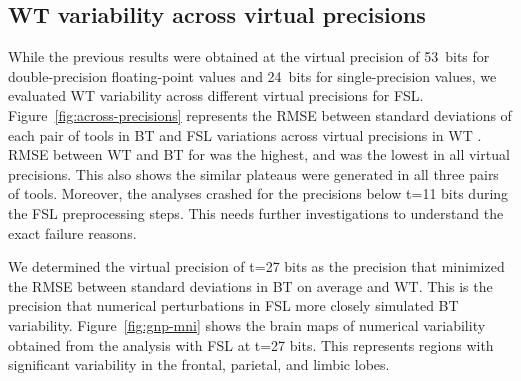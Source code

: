 \documentclass[conference]{IEEEtran}
\begin{document}
\subsection{WT variability across virtual precisions}

While the previous results were obtained at the virtual precision of 53~bits for double-precision floating-point values
and 24~bits for single-precision values, we evaluated WT variability across different virtual precisions for FSL. 
Figure~\ref{fig:across-precisions} represents the RMSE between standard deviations of each pair of tools in BT and FSL variations across virtual precisions in WT .
RMSE between WT and BT for \fslafni was the highest, and \fslspm was the lowest in all virtual precisions.
This also shows the similar plateaus were generated in all three pairs of tools.
Moreover, the analyses crashed for the precisions below t=11 bits during the FSL preprocessing steps. 
This needs further investigations to understand the exact failure reasons. 

We determined the virtual precision of t=27 bits as the precision that minimized the RMSE between standard deviations in BT on average and WT.
This is the precision that numerical perturbations in FSL more closely simulated BT variability.
Figure~\ref{fig:gnp-mni} shows the brain maps of numerical variability obtained from the analysis with FSL at t=27 bits.
This represents regions with significant variability in the frontal, parietal, and limbic lobes.

  \begin{figure}[ht]
  \end{figure}
\end{document}

